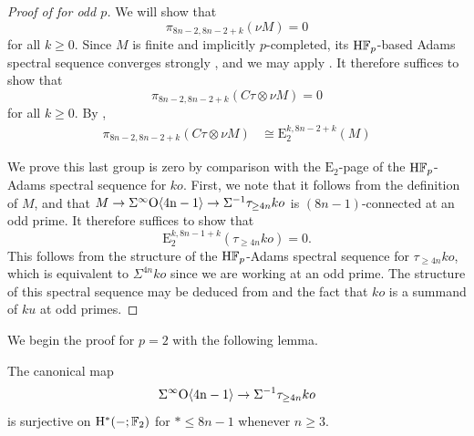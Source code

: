 \begin{proof}[Proof of  for odd $p$]
  We will show that
  \[ \pi_{8n-2, 8n-2 + k} (\nu M ) = 0 \]
    for all $k \geq 0$. Since $M$ is finite and implicitly $p$-completed, its $\mathrm{H}\mathbb{F}_p$-based Adams spectral sequence converges strongly \cite[Theorem 6.6]{BousfieldLocalization}, and we may apply . It therefore suffices to show that
  \[\pi_{8n-2, 8n-2+k} (C\tau \otimes \nu M) = 0\]
  for all $k \geq 0$.
  By , 
  \begin{align*}
    \pi_{8n-2, 8n-2+k} (C\tau \otimes \nu M ) &\cong \mathrm{E}_2^{k,8n-2+k}(M) 
  \end{align*}

  We prove this last group is zero by comparison with the $\mathrm{E}_2$-page of the $\mathrm{H}\mathbb{F}_p$-Adams spectral sequence for $ko$. First, we note that it follows from the definition of $M$,  and  that $M \to \Sigma^{\infty} \mathrm{O \langle 4n-1\rangle} \to \Sigma^{-1} \tau_{\geq 4n} ko$ is $(8n-1)$-connected at an odd prime. It therefore suffices to show that \[\mathrm{E}_2 ^{k, 8n-1+k} (\tau_{\geq 4n} ko) = 0.\] This follows from the structure of the $\mathrm{H}\mathbb{F}_p$-Adams spectral sequence for $\tau_{\geq 4n} ko$, which is equivalent to $\Sigma^{4n} ko$ since we are working at an odd prime. The structure of this spectral sequence may be deduced from \cite[Theorem 3.1.16]{GreenBook} and the fact that $ko$ is a summand of $ku$ at odd primes.
\end{proof}

We begin the proof for $p=2$ with the following lemma.

\begin{lem}\label{lemm:cohsurj2}
	The canonical map \[\Sigma^{\infty} \mathrm{O}\mathrm{\langle 4n-1 \rangle} \to \Sigma^{-1} \tau_{\geq 4n} ko\] is surjective on $\mathrm{H}^* (-; \operatorname{\mathbb{F}}_2)$ for $* \leq 8n-1$ whenever $n \geq 3$.
\end{lem}

